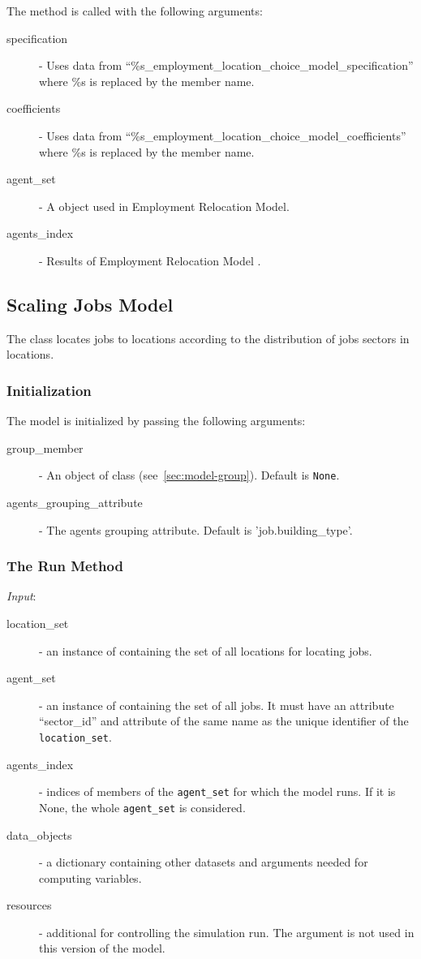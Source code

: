 The  method is called with the following arguments:
\begin{description}
\item[specification] - Uses data from
  ``\%s_employment_location_choice_model_specification'' where \%s is replaced by the member name.
\item[coefficients] \coefficientsindex - Uses data from ``\%s_employment_location_choice_model_coefficients'' 
    where \%s is replaced by the member name. \coefficientsindex\modelsindex
\item[agent_set] - A  object used in Employment Relocation Model. \modelsindex
\item[agents_index] - Results of Employment Relocation Model \modelsindex.
\end{description}
 
\subsection{Scaling Jobs Model}
\modelsindex
%
\label{sec:scaling-jobs-model} 
%
The class  \modelsindex locates jobs to locations according to the
distribution of jobs sectors in locations. 
\subsubsection{Initialization}
The model is initialized by passing the following arguments:
\begin{description}
\item[group_member] - An object of class  (see~\ref{sec:model-group}). Default is \verb|None|.
\item[agents_grouping_attribute] - The agents grouping attribute. Default is 'job.building_type'.
\end{description}

\subsubsection{The Run Method}
%
{\it Input}:
\begin{description}
\item[location_set] - an instance of  containing the set of all
  locations for locating jobs.
\item[agent_set] - an instance of  containing the set of all
  jobs. It must have an attribute \attributesindex ``sector_id'' and attribute \attributesindex of the same name
  as the unique identifier of the \verb|location_set|.
\item[agents_index] - indices of members of the \verb|agent_set| for which the
  model \modelsindex runs. If it is None, the whole \verb|agent_set| is considered.
\item[data_objects] - a dictionary containing other datasets \datasetindex and arguments
  needed for computing variables. \variablesindex
\item[resources] - additional  for controlling the
  simulation run. The argument is not used in this version of the model. \modelsindex
\end{description}

